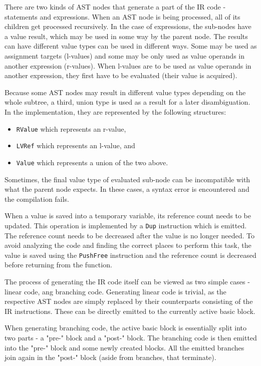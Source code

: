 There are two kinds of AST nodes that generate a part of the IR code - statements and expressions. When an AST node is being processed, all of its children get processed recursively. In the case of expressions, the sub-nodes have a value result, which may be used in some way by the parent node. The results can have different value types can be used in different ways. Some may be used as assignment targets (l-values) and some may be only used as value operands in another expression (r-values). When l-values are to be used as value operands in another expression, they first have to be evaluated (their value is acquired).

Because some AST nodes may result in different value types depending on the whole subtree, a third, union type is used as a result for a later disambiguation. In the implementation, they are represented by the following structures:
\begin{itemize}
\item \texttt{RValue} which represents an r-value,
\item \texttt{LVRef} which represents an l-value, and
\item \texttt{Value} which represents a union of the two above.
\end{itemize}

Sometimes, the final value type of evaluated sub-node can be incompatible with what the parent node expects. In these cases, a syntax error is encountered and the compilation fails.

When a value is saved into a temporary variable, its reference count needs to be updated. This operation is implemented by a \texttt{Dup} instruction which is emitted. The reference count needs to be decreased after the value is no longer needed. To avoid analyzing the code and finding the correct places to perform this task, the value is saved using the \texttt{PushFree} instruction and the reference count is decreased before returning from the function.

The process of generating the IR code itself can be viewed as two simple cases - linear code, ang branching code. Generating linear code is trivial, as the respective AST nodes are simply replaced by their counterparts consisting of the IR instructions. These can be directly emitted to the currently active basic block.

When generating branching code, the active basic block is essentially split into two parts - a "pre-" block and a "post-" block. The branching code is then emitted into the "pre-" block and some newly created blocks. All the emitted branches join again in the "post-" block (aside from branches, that terminate).


